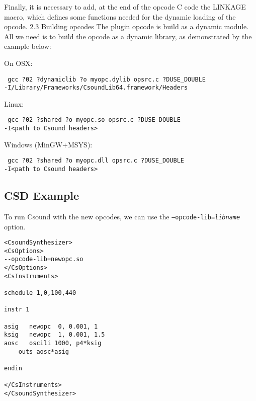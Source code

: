 \documentclass[11pt]{article}
\begin{document}
Finally, it is necessary to add, at the end of the opcode C code the LINKAGE macro, which defines some functions needed for the dynamic loading of the opcode. 
2.3	Building opcodes 
The plugin opcode is build as a dynamic module. All we need is to build the opcode as a dynamic library, as demonstrated by the example below:

On OSX:

{\tt
gcc ?02 ?dynamiclib ?o myopc.dylib opsrc.c ?DUSE\_DOUBLE \\
    -I/Library/Frameworks/CsoundLib64.framework/Headers}

Linux:

{\tt
gcc ?02 ?shared ?o myopc.so opsrc.c ?DUSE\_DOUBLE \\
    -I<path to Csound headers>
}

Windows (MinGW+MSYS):

{\tt
gcc ?02 ?shared ?o myopc.dll opsrc.c ?DUSE\_DOUBLE \\
    -I<path to Csound headers>
}

\subsection{CSD Example}

To run Csound with the new opcodes, we can use the {\tt --opcode-lib=\emph{libname}} option.

\begin{lstlisting}
<CsoundSynthesizer>
<CsOptions>
--opcode-lib=newopc.so
</CsOptions>
<CsInstruments>

schedule 1,0,100,440

instr 1

asig   newopc  0, 0.001, 1
ksig   newopc  1, 0.001, 1.5
aosc   oscili 1000, p4*ksig
    outs aosc*asig

endin

</CsInstruments>
</CsoundSynthesizer>
\end{lstlisting}
\end{document}
